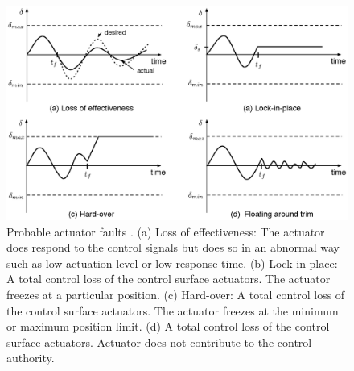 \begin{figure}
\begin{center}
\includegraphics[width=14cm]{figures/actuatorFaults}    %
\caption{Probable actuator faults \cite{ducard2009fault}. (a) Loss of effectiveness: The actuator does respond to the control signals but does so in an abnormal way such as low actuation level or low response time. (b) Lock-in-place: A total control loss of the control surface actuators. The actuator freezes at a particular position. (c) Hard-over: A total control loss of the control surface actuators. The actuator freezes at the minimum or maximum position limit. (d) A total control loss of the control surface actuators. Actuator does not contribute to the control authority.} 
\label{fig:actuatorFaults}
\end{center}
\end{figure}







